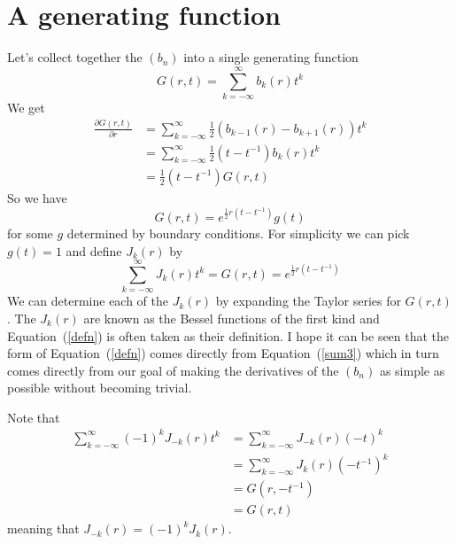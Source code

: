 \documentclass{article}
\begin{document}
\section{A generating function}
Let's collect together the $(b_n)$ into a single generating function
\[
G(r,t) = \sum_{k=-\infty}^\infty b_k(r)t^k
\]
We get
\begin{align*}
\frac{\partial G(r,t)}{\partial r} &= \sum_{k=-\infty}^\infty \frac{1}{2}(b_{k-1}(r)-b_{k+1}(r))t^k\\
&= \sum_{k=-\infty}^\infty \frac{1}{2}(t-t^{-1})b_k(r)t^k \\
&= \frac{1}{2}(t-t^{-1})G(r,t)
\end{align*}
So we have
\[
G(r,t) = e^{\frac{1}{2}r(t-t^{-1})}g(t)
\]
for some $g$ determined by boundary conditions.
For simplicity we can pick $g(t) = 1$ and define $J_k(r)$ by
\begin{equation}
\boxed{\sum_{k=-\infty}^\infty J_k(r)t^k = G(r,t) = e^{\frac{1}{2}r(t-t^{-1})}}\label{defn}
\end{equation}
We can determine each of the $J_k(r)$ by expanding the Taylor series for $G(r, t)$.
The $J_k(r)$ are known as the Bessel functions of the first kind and Equation~(\ref{defn}) is often taken as their definition.
I hope it can be seen that the form of Equation~(\ref{defn}) comes directly from Equation~(\ref{sum3}) which in turn comes directly from our goal of making the derivatives of the $(b_n)$ as simple as possible without becoming trivial.

Note that
\begin{align*}
\sum_{k=-\infty}^\infty (-1)^kJ_{-k}(r)t^k
&= \sum_{k=-\infty}^\infty J_{-k}(r)(-t)^k \\
&= \sum_{k=-\infty}^\infty J_k(r)(-t^{-1})^k \\
&= G(r,-t^{-1}) \\
&= G(r,t)
\end{align*}
meaning that $J_{-k}(r) = (-1)^kJ_{k}(r)$.
\end{document}
